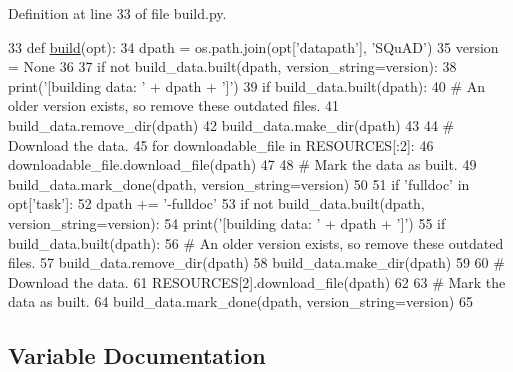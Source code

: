 Definition at line 33 of file build.\+py.


\begin{DoxyCode}
33 \textcolor{keyword}{def }\hyperlink{namespacedialog__babi__feedback_1_1build_a7a9d289f7493a5ded13c4b7f071b6184}{build}(opt):
34     dpath = os.path.join(opt[\textcolor{stringliteral}{'datapath'}], \textcolor{stringliteral}{'SQuAD'})
35     version = \textcolor{keywordtype}{None}
36 
37     \textcolor{keywordflow}{if} \textcolor{keywordflow}{not} build\_data.built(dpath, version\_string=version):
38         print(\textcolor{stringliteral}{'[building data: '} + dpath + \textcolor{stringliteral}{']'})
39         \textcolor{keywordflow}{if} build\_data.built(dpath):
40             \textcolor{comment}{# An older version exists, so remove these outdated files.}
41             build\_data.remove\_dir(dpath)
42         build\_data.make\_dir(dpath)
43 
44         \textcolor{comment}{# Download the data.}
45         \textcolor{keywordflow}{for} downloadable\_file \textcolor{keywordflow}{in} RESOURCES[:2]:
46             downloadable\_file.download\_file(dpath)
47 
48         \textcolor{comment}{# Mark the data as built.}
49         build\_data.mark\_done(dpath, version\_string=version)
50 
51     \textcolor{keywordflow}{if} \textcolor{stringliteral}{'fulldoc'} \textcolor{keywordflow}{in} opt[\textcolor{stringliteral}{'task'}]:
52         dpath += \textcolor{stringliteral}{'-fulldoc'}
53         \textcolor{keywordflow}{if} \textcolor{keywordflow}{not} build\_data.built(dpath, version\_string=version):
54             print(\textcolor{stringliteral}{'[building data: '} + dpath + \textcolor{stringliteral}{']'})
55             \textcolor{keywordflow}{if} build\_data.built(dpath):
56                 \textcolor{comment}{# An older version exists, so remove these outdated files.}
57                 build\_data.remove\_dir(dpath)
58             build\_data.make\_dir(dpath)
59 
60             \textcolor{comment}{# Download the data.}
61             RESOURCES[2].download\_file(dpath)
62 
63             \textcolor{comment}{# Mark the data as built.}
64             build\_data.mark\_done(dpath, version\_string=version)
65 \end{DoxyCode}


\subsection{Variable Documentation}
\mbox{\label{namespaceparlai_1_1tasks_1_1squad_1_1build_a61589d585f7e9b43934aadf6ad9480f5}} 
